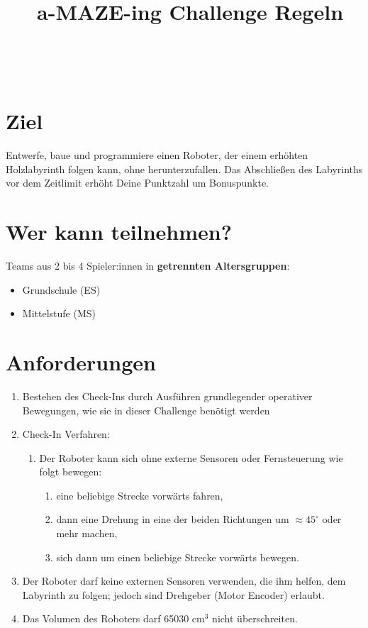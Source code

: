 \documentclass[a4paper,12pt]{article}
\begin{document}



\title{\tagYear\ a-MAZE-ing Challenge Regeln}

\makeatletter
\let\inserttitle\@title
\makeatother
\begin{center}
	\rrgerLogo
	\huge                      %
	\bfseries                   %
	\\
	\inserttitle
\end{center}
\section{Ziel}
Entwerfe, baue und programmiere einen Roboter, der einem erhöhten Holzlabyrinth
folgen kann, ohne herunterzufallen. Das Abschließen des Labyrinths vor dem
Zeitlimit erhöht Deine Punktzahl um Bonuspunkte.

\section{Wer kann teilnehmen?}
Teams aus 2 bis 4 Spieler:innen in \textbf{getrennten Altersgruppen}:

\begin{itemize}
	\item Grundschule (ES)
	\item Mittelstufe (MS)
\end{itemize}
\combineDivisions

\section{Anforderungen}
\robotRequirements
\begin{enumerate}
	\item Bestehen des Check-Ins durch Ausführen grundlegender operativer
		Bewegungen, wie sie in dieser Challenge benötigt werden
	\item Check-In Verfahren:
	\begin{enumerate}
		\item Der Roboter kann sich ohne externe Sensoren oder
			Fernsteuerung wie folgt bewegen:
		\begin{enumerate}
			\item eine beliebige Strecke vorwärts fahren,
			\item dann eine Drehung in eine der beiden Richtungen
				um $\approx 45^{\circ}$ oder mehr machen,
			\item sich dann um einen beliebige Strecke vorwärts
				bewegen.
		\end{enumerate}
	\end{enumerate}
	\item Der Roboter darf keine externen Sensoren verwenden, die ihm
		helfen, dem Labyrinth zu folgen; jedoch sind Drehgeber (Motor
		Encoder) erlaubt.
	\item Das Volumen des Roboters darf 65030 cm$^{3}$ nicht überschreiten.
\end{enumerate}
\end{document}
